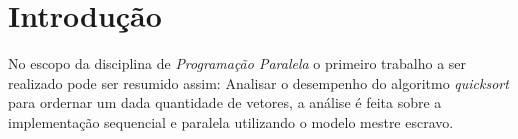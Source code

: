 \section{Introdução}

	No escopo da disciplina de \emph{Programação Paralela} o primeiro 
	trabalho a ser realizado pode ser resumido assim: Analisar o 
	desempenho do algoritmo \emph{quicksort} para ordernar um dada 
	quantidade de vetores, a análise é feita sobre a implementação 
	sequencial e paralela utilizando o modelo mestre escravo.
